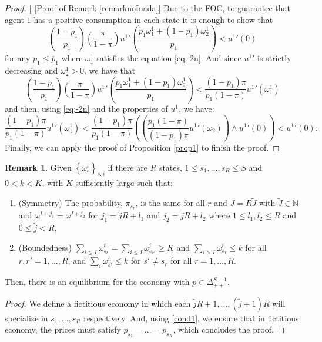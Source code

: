 \documentclass[pdftex]{article}
\numberwithin{equation}{section}
\theoremstyle{th}
\newtheorem{proof lemma}{{Proof Lemma}.}
\theoremstyle{definition}
\newtheorem{remark}{Remark}%
\begin{document}
{\begin{proof}{[}
{[}Proof of Remark \ref{remarknoInada}{]} Due to the FOC, to guarantee
that agent $1$ has a positive consumption in each state it is enough
to show that 
\begin{equation}
\left(\frac{1-p_{1}}{p_{1}}\right)\left(\frac{\pi}{1-\pi}\right){u^{1}}'\left(\frac{p_{1}\omega_{1}^{1}+\left(1-p_{1}\right)\omega_{2}^{1}}{p_{1}}\right)<{u^{1}}'\left(0\right)\label{eq:-7}
\end{equation}
for any $p_{1}\leq\overline{p}_{1}$ where $\omega_{1}^{1}$ satisfies
the equation \ref{eq:-2n}. And since ${u^{1}}'$ is strictly decreasing
and $\omega_{2}^{1}>0$, we have that 
\[
\left(\frac{1-p_{1}}{p_{1}}\right)\left(\frac{\pi}{1-\pi}\right){u^{1}}'\left(\frac{p_{1}\omega_{1}^{1}+\left(1-p_{1}\right)\omega_{2}^{1}}{p_{1}}\right)<\frac{(1-p_{1})\pi}{p_{1}(1-\pi)}{u^{1}}'\left(\omega_{1}^{1}\right)
\]
and then, using \ref{eq:-2n} and the properties of $u^{1}$, we have:
\[
\frac{(1-p_{1})\pi}{p_{1}(1-\pi)}{u^{1}}'\left(\omega_{1}^{1}\right)<\frac{(1-p_{1})\pi}{p_{1}(1-\pi)}\left(\left(\frac{p_{1}(1-\pi)}{(1-p_{1})\pi}{u^{1}}'\left(\omega_{2}\right)\right)\wedge{u^{1}}'\left(0\right)\right)<{u^{1}}'(0).
\]
Finally, we can apply the proof of Proposition \ref{prop1} to finish
the proof.

\end{proof}


\begin{remark}
\label{remks}
Given $\left\{\omega_s^i\right\}_{s,i}$ if there are $R$ states, $1\leq{s_1},\dots,s_R\leq{S}$ and $0<k<K$, with $K$ sufficiently large such that:
\begin{enumerate}
\item (Symmetry)\label{cond1} The probability, $\pi_{s_r}$, is the same for all $r$ and $J=R\tilde{J}$ with $\tilde{J}\in\mathbb{N}$ and $\omega^{I+j_1}=\omega^{I+j_2}$ for $j_1=\tilde{j}R+l_1$ and $j_2=\tilde{j}R+l_2$ where $1\leq{l}_1,l_2\leq{R}$ and $0\leq\tilde{j}<R$,
\item (Boundedness) $\sum_{i\leq{I}}\omega_{s_r}^i=\sum_{i\leq{I}}\omega^i_{s_{r'}}\geq{K}$ and $\sum_{i>I}\omega_{s_r}^i\leq{k}$ for all $r,r'=1,\dots,R$, and $\sum_{i}\omega_{s'}^i\leq{k}$ for $s'\neq{s}_r$ for all ${r}=1,\dots,R$.
\end{enumerate}
Then, there is an equilibrium for the economy with $p\in\Delta_{++}^{S-1}.$
\end{remark}


\begin{proof}
We define a fictitious economy in which each $\tilde{j}R+1,\dots,\left(\tilde{j}+1\right)R$ will specialize in $s_1,\dots,s_R$ respectively. And, using \ref{cond1}, we ensure that in fictitious economy, the prices must satisfy $p_{s_1}=\dots=p_{s_R}$, which concludes the proof.
\end{proof}

}
\end{document}
